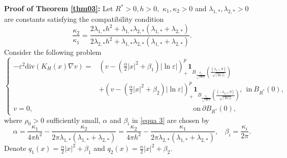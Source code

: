\documentclass[12pt,reqno]{amsart}
\numberwithin{equation}{section}
\theoremstyle{definition}
\theoremstyle{remark}
\begin{document}
\textbf{Proof of Theorem \ref{thm03}:}
Let $   R^*>0, h>0, $ $ \kappa_1,\kappa_2>0 $ and $ \lambda_{1,*},\lambda_{2,*}>0 $ are constants satisfying the compatibility condition
\begin{equation*} 
\frac{\kappa_2}{\kappa_1}=\frac{2\lambda_{1,*}h^2+\lambda_{1,*}\lambda_{2,*}(\lambda_{1,*}+\lambda_{2,*})}{2\lambda_{2,*}h^2+\lambda_{1,*}\lambda_{2,*}(\lambda_{1,*}+\lambda_{2,*})}.
\end{equation*}
Consider  the following problem
\begin{equation}\label{equa 3}
\begin{cases}
-\varepsilon^2\text{div}(K_H(x)\nabla v)=&\left (v-\left(\frac{\alpha}{2}|x|^2+\beta_1 \right)|\ln\varepsilon| \right )^{p}_+\textbf{1}_{B_{\frac{\rho_0}{\sqrt{|\ln\varepsilon|}}}\left (\frac{(\lambda_{1,*},0)}{\sqrt{|\ln\varepsilon|}}\right )}\\
&+\left (v-\left(\frac{\alpha}{2}|x|^2+\beta_2 \right)|\ln\varepsilon| \right )^{p}_+\textbf{1}_{B_{\frac{\rho_0}{\sqrt{|\ln\varepsilon|}}}\left (\frac{(-\lambda_{2,*},0)}{\sqrt{|\ln\varepsilon|}}\right )},\ \ \text{in}\  B_{R^*}(0),\\
v=0,&\ \ \ \ \ \ \ \ \ \ \ \ \ \ \ \ \ \ \ \ \ \ \ \ \ \ \ \ \ \ \ \ \ \ \ \ \ \ \ \ \ \ \ \ \ \ \ \ \ \ \ \ \ \ \ \ \ \ \ \ \text{on}\ \partial B_{R^*}(0),
\end{cases}
\end{equation}
where  $ \rho_0>0 $ sufficiently small, %
$ \alpha $ and $ \beta_i $ in \eqref{equa 3} are chosen by
\begin{equation*}
\alpha=\frac{\kappa_1}{4\pi h^2}  -\frac{\kappa_2}{2\pi \lambda_{1,*}(\lambda_{1,*}+\lambda_{2,*})}=\frac{\kappa_2}{4\pi h^2}  -\frac{\kappa_1}{2\pi \lambda_{2,*}(\lambda_{1,*}+\lambda_{2,*})},\ \ \ \ \beta_i=\frac{\kappa_i}{2\pi}.
\end{equation*}
Denote $ q_1(x)=\frac{\alpha}{2}|x|^2+\beta_1 $ and $ q_2(x)=\frac{\alpha}{2}|x|^2+\beta_2. $
\end{document}
